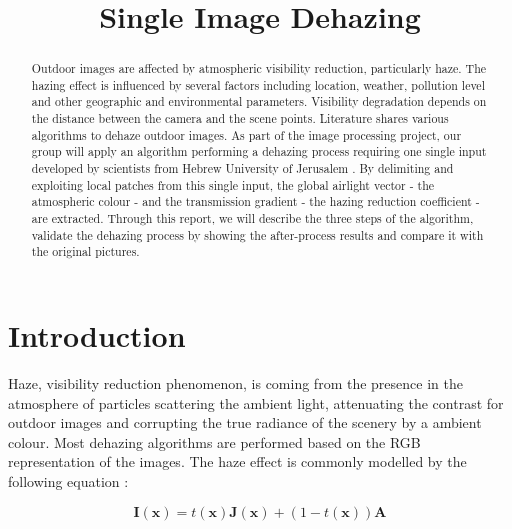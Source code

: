\documentclass[conference]{IEEEtran}
\begin{document}
\title{Single Image Dehazing}

\author{
\and
{}
\and
{}
}

\maketitle

\begin{abstract}
Outdoor images are affected by atmospheric visibility reduction, particularly haze. The hazing effect is influenced by several 
factors including location, weather, pollution level and other geographic and environmental parameters. Visibility degradation depends on the distance between the camera and the scene points. Literature shares various algorithms to dehaze outdoor 
images.  As part of the image processing project, our group will apply an algorithm performing a dehazing process requiring
one single input developed by scientists from Hebrew University of Jerusalem \cite{b1} \cite{b2}. By delimiting and exploiting local patches from this single input, the global airlight vector - the atmospheric
colour - and the transmission gradient - the hazing reduction coefficient - are extracted.  Through this report, we will describe 
the three steps of the algorithm, validate the dehazing process by showing the after-process results and compare it with the 
original pictures.  
\end{abstract}

\section{Introduction}

Haze, visibility reduction phenomenon, is coming from the presence in the atmosphere of particles scattering the ambient 
light, attenuating the contrast for outdoor images and corrupting the true radiance of the scenery by a ambient colour.
Most dehazing algorithms are performed based on the RGB representation of the images.
The haze effect is commonly modelled by the following equation \cite{b1}:

\begin{equation}
\label{image_model}
\mathbf{I}(\mathbf{x}) = t(\mathbf{x}) \mathbf{J}(\mathbf{x}) + (1-t(\mathbf{x})) \mathbf{A}
\end{equation}
\end{document}
